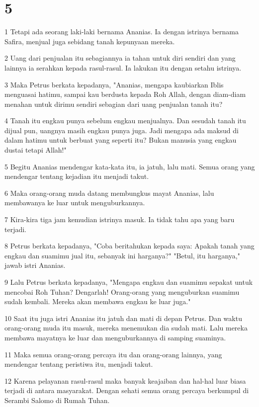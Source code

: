 \chapter{5}

\par 1 Tetapi ada seorang laki-laki bernama Ananias. Ia dengan istrinya bernama Safira, menjual juga sebidang tanah kepunyaan mereka.
\par 2 Uang dari penjualan itu sebagiannya ia tahan untuk diri sendiri dan yang lainnya ia serahkan kepada rasul-rasul. Ia lakukan itu dengan setahu istrinya.
\par 3 Maka Petrus berkata kepadanya, "Ananias, mengapa kaubiarkan Iblis menguasai hatimu, sampai kau berdusta kepada Roh Allah, dengan diam-diam menahan untuk dirimu sendiri sebagian dari uang penjualan tanah itu?
\par 4 Tanah itu engkau punya sebelum engkau menjualnya. Dan sesudah tanah itu dijual pun, uangnya masih engkau punya juga. Jadi mengapa ada maksud di dalam hatimu untuk berbuat yang seperti itu? Bukan manusia yang engkau dustai tetapi Allah!"
\par 5 Begitu Ananias mendengar kata-kata itu, ia jatuh, lalu mati. Semua orang yang mendengar tentang kejadian itu menjadi takut.
\par 6 Maka orang-orang muda datang membungkus mayat Ananias, lalu membawanya ke luar untuk menguburkannya.
\par 7 Kira-kira tiga jam kemudian istrinya masuk. Ia tidak tahu apa yang baru terjadi.
\par 8 Petrus berkata kepadanya, "Coba beritahukan kepada saya: Apakah tanah yang engkau dan suamimu jual itu, sebanyak ini harganya?" "Betul, itu harganya," jawab istri Ananias.
\par 9 Lalu Petrus berkata kepadanya, "Mengapa engkau dan suamimu sepakat untuk mencobai Roh Tuhan? Dengarlah! Orang-orang yang menguburkan suamimu sudah kembali. Mereka akan membawa engkau ke luar juga."
\par 10 Saat itu juga istri Ananias itu jatuh dan mati di depan Petrus. Dan waktu orang-orang muda itu masuk, mereka menemukan dia sudah mati. Lalu mereka membawa mayatnya ke luar dan menguburkannya di samping suaminya.
\par 11 Maka semua orang-orang percaya itu dan orang-orang lainnya, yang mendengar tentang peristiwa itu, menjadi takut.
\par 12 Karena pelayanan rasul-rasul maka banyak keajaiban dan hal-hal luar biasa terjadi di antara masyarakat. Dengan sehati semua orang percaya berkumpul di Serambi Salomo di Rumah Tuhan.
